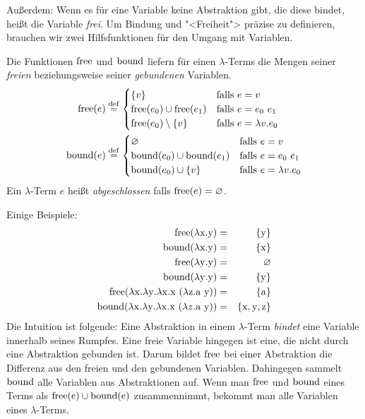 Außerdem: Wenn es für eine Variable keine Abstraktion gibt, die diese
bindet, heißt die Variable \textit{frei}.
Um Bindung und "<Freiheit"> präzise zu definieren, brauchen wir zwei
Hilfsfunktionen für den Umgang mit Variablen.
%
\begin{definition}
  Die Funktionen $\operatorname{free}$ und $\operatorname{bound}$ liefern für einen
  $\lambda$-Terms die Mengen seiner \emph{freien} beziehungsweise seiner
  \emph{gebundenen} Variablen.  %
  \begin{align*}
    \operatorname{free}(e) & \stackrel{\rm def}{=}
    \begin{cases}
      \{ v \}  & \text{falls } e  = v\\
      \operatorname{free}(e_0) \cup \operatorname{free}(e_1) & \text{falls } e = e_0~e_1\\
      \operatorname{free}(e_0) \setminus \{v\} & \text{falls } e = \lambda v.e_0
    \end{cases}\\
    \operatorname{bound}(e) & \stackrel{\rm def}{=}
    \begin{cases}
      \varnothing & \text{falls } e = v\\
      \operatorname{bound}(e_0) \cup \operatorname{bound}(e_1) & \text{falls } e = e_0~e_1\\
      \operatorname{bound}(e_0) \cup \{v\} & \text{falls } e = \lambda v.e_0
    \end{cases}
  \end{align*}
  Ein
  $\lambda$-Term $e$ heißt \emph{abgeschlossen}
  falls $\operatorname{free}(e)=\varnothing$.
\end{definition}
%
Einige Beispiele:
%
\begin{eqnarray*}
  \operatorname{free}(\lambda \mathrm x.\mathrm y) &=& \{\mathrm y\}\\
  \operatorname{bound}(\lambda \mathrm x.\mathrm y) &=& \{\mathrm x\}\\
  \operatorname{free}(\lambda \mathrm y.\mathrm y) &=& \varnothing\\
  \operatorname{bound}(\lambda \mathrm y.\mathrm y) &=& \{\mathrm y\}\\
  \operatorname{free}(\lambda \mathrm x.\lambda \mathrm y.\lambda \mathrm x.\mathrm x~(\lambda \mathrm z.\mathrm a~\mathrm y)) &=& \{ \mathrm a\}\\
  \operatorname{bound}(\lambda \mathrm x.\lambda \mathrm y.\lambda \mathrm x.\mathrm x~(\lambda z.\mathrm a~\mathrm y)) &=& \{ \mathrm x,\mathrm y,\mathrm z\}
\end{eqnarray*}
%
Die Intuition ist folgende: Eine Abstraktion in einem $\lambda$-Term
\emph{bindet} eine Variable innerhalb seines Rumpfes.  Eine freie
Variable hingegen ist eine, die nicht durch eine Abstraktion gebunden
ist.  Darum bildet $\operatorname{free}$ bei einer Abstraktion die Differenz aus den
freien und den gebundenen
Variablen.  Dahingegen sammelt $\operatorname{bound}$ alle Variablen aus
Abstraktionen auf.  Wenn man $\operatorname{free}$ und $\operatorname{bound}$ eines Terms als
$\operatorname{free}(e)\cup\operatorname{bound}(e)$ zusammennimmt, bekommt man alle Variablen
eines $\lambda$-Terms.

